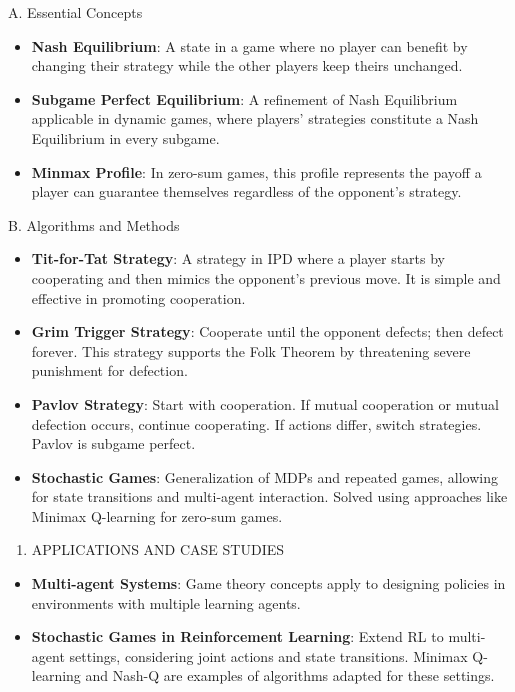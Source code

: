 \documentclass[
  12pt,
]{report}
\providecommand{\tightlist}{%
  \setlength{\itemsep}{0pt}\setlength{\parskip}{0pt}}
\begin{document}
A. Essential Concepts

\begin{itemize}
\item
  \textbf{Nash Equilibrium}: A state in a game where no player can benefit by changing their strategy while the other players keep theirs unchanged.
\item
  \textbf{Subgame Perfect Equilibrium}: A refinement of Nash Equilibrium applicable in dynamic games, where players' strategies constitute a Nash Equilibrium in every subgame.
\item
  \textbf{Minmax Profile}: In zero-sum games, this profile represents the payoff a player can guarantee themselves regardless of the opponent's strategy.
\end{itemize}

B. Algorithms and Methods

\begin{itemize}
\item
  \textbf{Tit-for-Tat Strategy}: A strategy in IPD where a player starts by cooperating and then mimics the opponent's previous move. It is simple and effective in promoting cooperation.
\item
  \textbf{Grim Trigger Strategy}: Cooperate until the opponent defects; then defect forever. This strategy supports the Folk Theorem by threatening severe punishment for defection.
\item
  \textbf{Pavlov Strategy}: Start with cooperation. If mutual cooperation or mutual defection occurs, continue cooperating. If actions differ, switch strategies. Pavlov is subgame perfect.
\item
  \textbf{Stochastic Games}: Generalization of MDPs and repeated games, allowing for state transitions and multi-agent interaction. Solved using approaches like Minimax Q-learning for zero-sum games.
\end{itemize}

\begin{enumerate}
\def\labelenumi{\arabic{enumi}.}
\setcounter{enumi}{2}
\tightlist
\item
  APPLICATIONS AND CASE STUDIES
\end{enumerate}

\begin{itemize}
\item
  \textbf{Multi-agent Systems}: Game theory concepts apply to designing policies in environments with multiple learning agents.
\item
  \textbf{Stochastic Games in Reinforcement Learning}: Extend RL to multi-agent settings, considering joint actions and state transitions. Minimax Q-learning and Nash-Q are examples of algorithms adapted for these settings.
\end{itemize}
\end{document}
